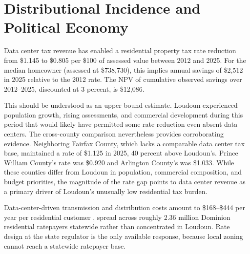 \documentclass[12pt]{article}
\begin{document}
\section{Distributional Incidence and Political Economy}
\label{sec:discussion}

Data center tax revenue has enabled a residential property tax rate reduction from \$1.145 to \$0.805 per \$100 of assessed value between 2012 and 2025. For the median homeowner (assessed at \$738,730), this implies annual savings of \$2,512 in 2025 relative to the 2012 rate. The NPV of cumulative observed savings over 2012--2025, discounted at 3 percent, is \$12,086.

This should be understood as an upper bound estimate. Loudoun experienced population growth, rising assessments, and commercial development during this period that would likely have permitted some rate reduction even absent data centers. The cross-county comparison nevertheless provides corroborating evidence. Neighboring Fairfax County, which lacks a comparable data center tax base, maintained a rate of \$1.125 in 2025, 40 percent above Loudoun's. Prince William County's rate was \$0.920 and Arlington County's was \$1.033. While these counties differ from Loudoun in population, commercial composition, and budget priorities, the magnitude of the rate gap points to data center revenue as a primary driver of Loudoun's unusually low residential tax burden.

Data-center-driven transmission and distribution costs amount to \$168--\$444 per year per residential customer \citep{JLARC2024}, spread across roughly 2.36 million Dominion residential ratepayers statewide rather than concentrated in Loudoun. Rate design at the state regulator is the only available response, because local zoning cannot reach a statewide ratepayer base.
\end{document}

